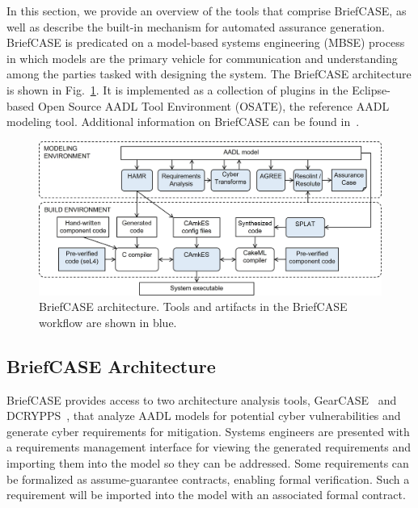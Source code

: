 In this section, we provide an overview of the tools that comprise BriefCASE, as well as describe the built-in mechanism for automated assurance generation.
BriefCASE is predicated on a model-based systems engineering (MBSE) process in which models are the primary vehicle for communication and understanding among the parties tasked with designing the system. 
The BriefCASE architecture is shown in Fig.~\ref{fig:briefcase-architecture}.
It is implemented as a collection of plugins in the Eclipse-based Open Source AADL Tool Environment (OSATE), the reference AADL modeling tool.   
Additional information on BriefCASE can be found in~\cite{case-at-scale}.

\begin{figure}[h] 
	\centering 
	\includegraphics[width=\textwidth]{figs/briefcase-architecture.jpg}
	\caption{BriefCASE architecture. Tools and artifacts in the BriefCASE workflow are shown in blue.}
	\label{fig:briefcase-architecture} 
\end{figure}

\subsection{BriefCASE Architecture}

BriefCASE provides access to two architecture analysis tools, GearCASE~\cite{gearcase2020} and DCRYPPS~\cite{dcrypps2019}, that analyze AADL models for potential cyber vulnerabilities and generate cyber requirements for mitigation. 
Systems engineers are presented with a requirements management interface for viewing the generated requirements and importing them into the model so they can be addressed.  
Some requirements can be formalized as assume-guarantee contracts, enabling formal verification. Such a requirement will be imported into the model with an associated formal contract.


